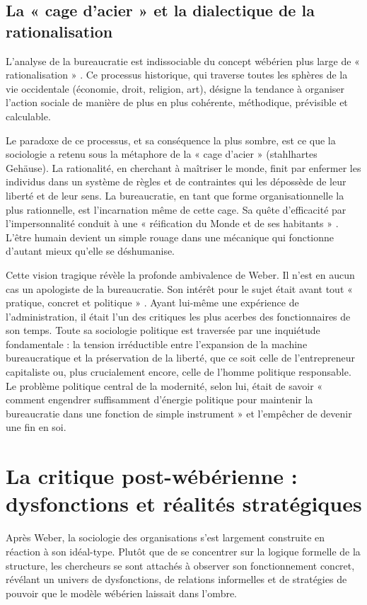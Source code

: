 \section{La « cage d'acier »  et la dialectique de la rationalisation}
L'analyse de la bureaucratie est indissociable du concept wébérien plus large de « rationalisation » . Ce processus historique, qui traverse toutes les sphères de la vie occidentale (économie, droit, religion, art), désigne la tendance à organiser l'action sociale de manière de plus en plus cohérente, méthodique, prévisible et calculable.

Le paradoxe de ce processus, et sa conséquence la plus sombre, est ce que la sociologie a retenu sous la métaphore de la « cage d'acier »  (stahlhartes Gehäuse). La rationalité, en cherchant à maîtriser le monde, finit par enfermer les individus dans un système de règles et de contraintes qui les dépossède de leur liberté et de leur sens. La bureaucratie, en tant que forme organisationnelle la plus rationnelle, est l'incarnation même de cette cage. Sa quête d'efficacité par l'impersonnalité conduit à une « réification du Monde et de ses habitants » . L'être humain devient un simple rouage dans une mécanique qui fonctionne d'autant mieux qu'elle se déshumanise.

Cette vision tragique révèle la profonde ambivalence de Weber. Il n'est en aucun cas un apologiste de la bureaucratie. Son intérêt pour le sujet était avant tout « pratique, concret et politique » . Ayant lui-même une expérience de l'administration, il était l'un des critiques les plus acerbes des fonctionnaires de son temps. Toute sa sociologie politique est traversée par une inquiétude fondamentale : la tension irréductible entre l'expansion de la machine bureaucratique et la préservation de la liberté, que ce soit celle de l'entrepreneur capitaliste ou, plus crucialement encore, celle de l'homme politique responsable. Le problème politique central de la modernité, selon lui, était de savoir « comment engendrer suffisamment d'énergie politique pour maintenir la bureaucratie dans une fonction de simple instrument »  et l'empêcher de devenir une fin en soi.

\chapter{La critique post-wébérienne : dysfonctions et réalités stratégiques}

Après Weber, la sociologie des organisations s'est largement construite en réaction à son idéal-type. Plutôt que de se concentrer sur la logique formelle de la structure, les chercheurs se sont attachés à observer son fonctionnement concret, révélant un univers de dysfonctions, de relations informelles et de stratégies de pouvoir que le modèle wébérien laissait dans l'ombre.

